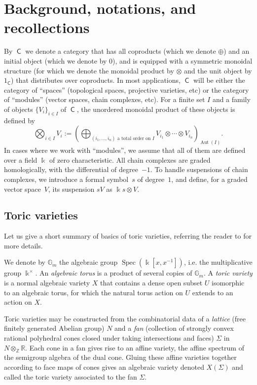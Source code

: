 \documentclass[11pt]{article}
\theoremstyle{definition}
\numberwithin{equation}{section}
\DeclareMathOperator{\sfC}{\mathsf{C}}
\DeclareMathOperator{\Aut}{Aut}
\newcommand\kk{\Bbbk}
\begin{document}
\section{Background, notations, and recollections}\label{sec:recollections}

By $\sfC$ we denote a category that has all coproducts (which we denote $\oplus$) and an initial object (which we denote by $0$), and is equipped with a symmetric monoidal structure (for which we denote the monoidal product by $\otimes$ and the unit object by $1_{\sfC}$) that distributes over coproducts. In most applications, $\sfC$ will be either the category of ``spaces'' (topological spaces, projective varieties, etc) or the category of ``modules'' (vector spaces, chain complexes, etc). For a finite set $I$ and a family of objects $\{V_i\}_{i\in I}$ of $\sfC$, the unordered monoidal product of these objects is defined by 
 \[
\bigotimes_{i\in I} V_i:=\left(\bigoplus_{(i_1,\ldots,i_n) \text{ a total order on } I} V_{i_1}\otimes\cdots\otimes V_{i_n}\right)_{\Aut(I)}.
 \]
In cases where we work with ``modules'', we assume that all of them are defined over a field $\kk$ of zero characteristic. All chain complexes are graded homologically, with the differential of degree~$-1$. To handle suspensions of chain complexes, we introduce a formal symbol~$s$ of degree~$1$, and define, for a graded vector space~$V$, its suspension $sV$ as $\kk s\otimes V$.

\subsection{Toric varieties}

Let us give a short summary of basics of toric varieties, referring the reader to \cite{MR495499,MR1234037} for more details.

We denote by $\mathbb{G}_m$ the algebraic group $\mathop{\mathrm{Spec}}\left(\kk[x,x^{-1}]\right)$, i.e. the multiplicative group $\kk^\times$.
An \emph{algebraic torus} is a product of several copies of $\mathbb{G}_m$. A \emph{toric variety} is a normal algebraic variety $X$ that contains a dense open subset $U$ isomorphic to an algebraic torus, for which the natural torus action on $U$ extends to an action on $X$. 

Toric varieties may be constructed from the combinatorial data of a \emph{lattice} (free finitely generated Abelian group) $N$ and a \emph{fan} (collection of strongly convex rational polyhedral cones closed under taking intersections and faces) $\Sigma$ in $N\otimes_{\mathbb{Z}}\mathbb{R}$. Each cone in a fan gives rise to an affine variety, the affine spectrum of the semigroup algebra of the dual cone. Gluing these affine varieties together according to face maps of cones gives an algebraic variety denoted $X(\Sigma)$ and called the toric variety associated to the fan $\Sigma$. 
    
\end{document}
